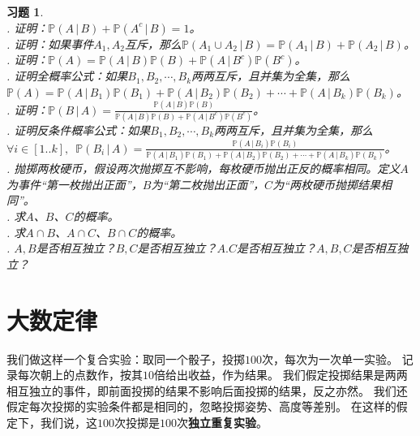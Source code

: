 \documentclass[12pt,UTF8]{ctexbook}
\newtheorem{xt}{习题}[section]
\begin{document}
\begin{xt}
    \mbox{} \\
    . 证明：$\mathbb{P}(A \, | \, B) + \mathbb{P}(A^c \, | \, B) = 1$。 \\
    . 证明：如果事件$A_1,A_2$互斥，那么$\mathbb{P}(A_1 \cup A_2\, | \, B) = \mathbb{P}(A_1 \, | \, B) + \mathbb{P}(A_2 \, | \, B)$。 \\
    . 证明：$\mathbb{P}(A) = \mathbb{P}(A \, | \, B) \mathbb{P}(B) + \mathbb{P}(A \, | \, B^c) \mathbb{P}(B^c)$。 \\
    . 证明全概率公式：如果$B_1, B_2, \cdots, B_k$两两互斥，且并集为全集，那么$\mathbb{P}(A) = \mathbb{P}(A \, | \, B_1) \mathbb{P}(B_1) + \mathbb{P}(A \, | \, B_2) \mathbb{P}(B_2) + \cdots + \mathbb{P}(A \, | \, B_k) \mathbb{P}(B_k)$。 \\
    . 证明：$\mathbb{P}(B \, | \, A) = \frac{\mathbb{P}(A \, | \, B) \mathbb{P}(B)}{\mathbb{P}(A \, | \, B) \mathbb{P}(B) + \mathbb{P}(A \, | \, B^c) \mathbb{P}(B^c)}$。 \\
    . 证明反条件概率公式：如果$B_1, B_2, \cdots, B_k$两两互斥，且并集为全集，那么$\forall i\in[1..k], \,\,\, \mathbb{P}(B_i \, | \, A) = \frac{\mathbb{P}(A \, | \, B_i) \mathbb{P}(B_i)}{\mathbb{P}(A \, | \, B_1) \mathbb{P}(B_1) + \mathbb{P}(A \, | \, B_2) \mathbb{P}(B_2) + \cdots + \mathbb{P}(A \, | \, B_k) \mathbb{P}(B_k)}$。 \\
    . 抛掷两枚硬币，假设两次抛掷互不影响，每枚硬币抛出正反的概率相同。定义$A$为事件“第一枚抛出正面”，$B$为“第二枚抛出正面”，$C$为“两枚硬币抛掷结果相同”。 \\
    . 求$A$、$B$、$C$的概率。\\
    . 求$A\cap B$、$A\cap C$、$B \cap C$的概率。\\
    . $A,B$是否相互独立？$B,C$是否相互独立？$A.C$是否相互独立？$A,B,C$是否相互独立？
\end{xt}

\section{大数定律}

我们做这样一个复合实验：取同一个骰子，投掷$100$次，每次为一次单一实验。
记录每次朝上的点数作，按其$10$倍给出收益，作为结果。
我们假定投掷结果是两两相互独立的事件，即前面投掷的结果不影响后面投掷的结果，反之亦然。
我们还假定每次投掷的实验条件都是相同的，忽略投掷姿势、高度等差别。
在这样的假定下，我们说，这$100$次投掷是$100$次\textbf{独立重复实验}。
\end{document}
